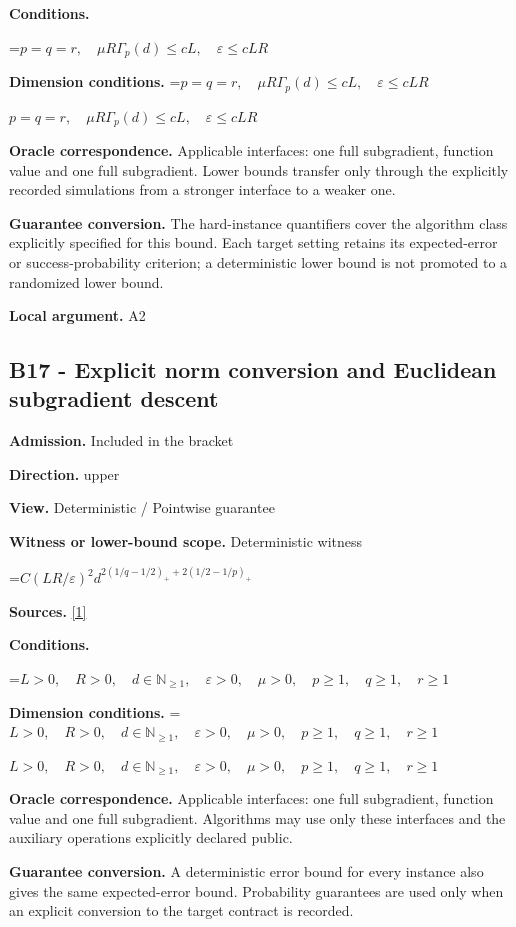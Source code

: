 \documentclass[10pt,a4paper]{article}
\newcommand{\AtlasMath}[1]{\par\begingroup\centering\setbox0=\hbox{$\displaystyle #1$}\ifdim\wd0>1.4\linewidth\typeout{ATLAS WIDE FORMULA: \the\wd0}\fi\ifdim\wd0>\linewidth\resizebox{\linewidth}{!}{\box0}\else\box0\fi\par\endgroup}
\newcommand{\AtlasInlineMath}[1]{\begingroup\setbox0=\hbox{$#1$}\ifdim\wd0>.4\linewidth\endgroup\AtlasMath{#1}\else\endgroup$#1$\fi}
\begin{document}
\textbf{Conditions.} 
\AtlasMath{p=q=r,\quad\mu R\Gamma_p(d)\le cL,\quad\varepsilon\le cLR}


\textbf{Dimension conditions.} \AtlasInlineMath{p=q=r,\quad\mu R\Gamma_p(d)\le cL,\quad\varepsilon\le cLR}

\textbf{Oracle correspondence.} Applicable interfaces: one full subgradient, function value and one full subgradient. Lower bounds transfer only through the explicitly recorded simulations from a stronger interface to a weaker one.

\textbf{Guarantee conversion.} The hard-instance quantifiers cover the algorithm class explicitly specified for this bound. Each target setting retains its expected-error or success-probability criterion; a deterministic lower bound is not promoted to a randomized lower bound.

\textbf{Local argument.} A2

\subsection{B17 - Explicit norm conversion and Euclidean subgradient descent}
\textbf{Admission.} Included in the bracket

\textbf{Direction.} upper

\textbf{View.} Deterministic / Pointwise guarantee

\textbf{Witness or lower-bound scope.} Deterministic witness

\AtlasMath{C(LR/\varepsilon)^2d^{2(1/q-1/2)_++2(1/2-1/p)_+}}
\textbf{Sources.} \href{https://arxiv.org/pdf/1405.4980}{[1]}

\textbf{Conditions.} 
\AtlasMath{L>0,\quad R>0,\quad d\in\mathbb{N}_{\ge1},\quad \varepsilon>0,\quad \mu>0,\quad p\ge1,\quad q\ge1,\quad r\ge1}


\textbf{Dimension conditions.} \AtlasInlineMath{L>0,\quad R>0,\quad d\in\mathbb{N}_{\ge1},\quad \varepsilon>0,\quad \mu>0,\quad p\ge1,\quad q\ge1,\quad r\ge1}

\textbf{Oracle correspondence.} Applicable interfaces: one full subgradient, function value and one full subgradient. Algorithms may use only these interfaces and the auxiliary operations explicitly declared public.

\textbf{Guarantee conversion.} A deterministic error bound for every instance also gives the same expected-error bound. Probability guarantees are used only when an explicit conversion to the target contract is recorded.
\end{document}
